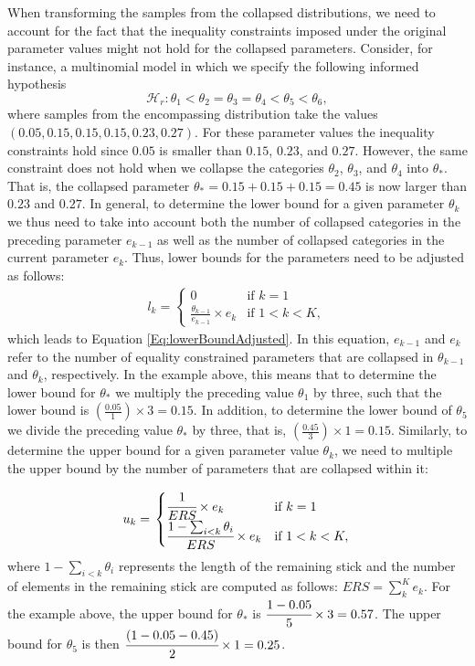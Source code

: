 \documentclass[
  english,
  man,floatsintext]{apa6}
\begin{document}
When transforming the samples from the collapsed distributions, we need
to account for the fact that the inequality constraints imposed under
the original parameter values might not hold for the collapsed
parameters. Consider, for instance, a multinomial model in which we
specify the following informed hypothesis
\[\mathcal{H}_r: \theta_1 < \theta_2 = \theta_3 = \theta_4 < \theta_5 < \theta_6,\]
where samples from the encompassing distribution take the values
\((0.05, 0.15, 0.15, 0.15, 0.23, 0.27)\). For these parameter values the
inequality constraints hold since \(0.05\) is smaller than \(0.15\),
\(0.23\), and \(0.27\). However, the same constraint does not hold when
we collapse the categories \(\theta_2\), \(\theta_3\), and \(\theta_4\)
into \(\theta_*\). That is, the collapsed parameter
\(\theta_* = 0.15 + 0.15 + 0.15 = 0.45\) is now larger than \(0.23\) and
\(0.27\). In general, to determine the lower bound for a given parameter
\(\theta_k\) we thus need to take into account both the number of
collapsed categories in the preceding parameter \(e_{k-1}\) as well as
the number of collapsed categories in the current parameter \(e_{k}\).
Thus, lower bounds for the parameters need to be adjusted as follows:
\begin{align*}
l_k = \left.
\begin{cases}
0 & \text{if } k = 1 \\
\frac{\theta_{k - 1}}{e_{k-1}} \times e_k & \text{if } 1 < k < K,
\end{cases}
\right.
\end{align*} which leads to Equation \ref{Eq:lowerBoundAdjusted}. In
this equation, \(e_{k-1}\) and \(e_k\) refer to the number of equality
constrained parameters that are collapsed in \(\theta_{k - 1}\) and
\(\theta_{k}\), respectively. In the example above, this means that to
determine the lower bound for \(\theta_*\) we multiply the preceding
value \(\theta_1\) by three, such that the lower bound is
\(\left(\frac{0.05}{1}\right)\times 3 = 0.15\). In addition, to
determine the lower bound of \(\theta_5\) we divide the preceding value
\(\theta_*\) by three, that is,
\(\left(\frac{0.45}{3}\right) \times 1 = 0.15\). Similarly, to determine
the upper bound for a given parameter value \(\theta_{k}\), we need to
multiple the upper bound by the number of parameters that are collapsed
within it:

\begin{align}
u_k = \left.
\begin{cases}
\cfrac{1}{ERS} \times e_k & \text{if } k = 1 \\
\cfrac{1 - \sum_{i < k} \theta_i}{ERS} \times e_k & \text{if } 1 < k < K,
\end{cases}
\right.
\end{align} where \(1 - \sum_{i < k} \theta_i\) represents the length of
the remaining stick and the number of elements in the remaining stick
are computed as follows: \(ERS = \sum_k^{K} e_k\). For the example
above, the upper bound for \(\theta_*\) is
\(\cfrac{1 - 0.05}{5} \times 3 = 0.57\). The upper bound for
\(\theta_5\) is then \(\cfrac{(1 - 0.05 - 0.45)}{2} \times 1 = 0.25\).
\end{document}
